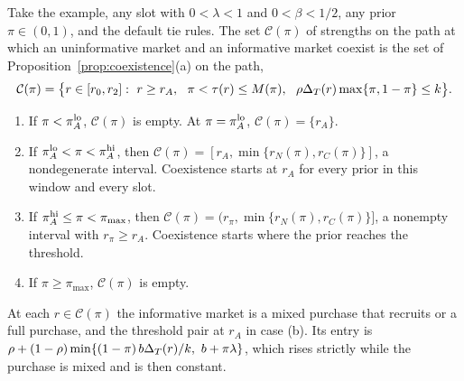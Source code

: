 \begin{corollary}\label{prop:priors}
Take the example, any slot with \(0<\lambda<1\) and \(0<\beta<1/2\), any prior \(\pi\in(0,1)\), and the default tie
rules. The set \(\mathcal C(\pi)\) of strengths on the path at which an uninformative market and an informative market coexist
is the set of Proposition~\ref{prop:coexistence}(a) on the path,
\[
\mathcal C(\pi)=\bigl\{r\in[r_0,r_2]:\ r\ge r_A,\ \ \pi<\tau(r)\le M(\pi),\ \ \rho\Delta_T(r)\max\{\pi,1-\pi\}\le k\bigr\}.
\]
\begin{enumerate}[label=(\alph*),leftmargin=2em]
\item If \(\pi<\pi_A^{\rm lo}\), \(\mathcal C(\pi)\) is empty. At \(\pi=\pi_A^{\rm lo}\), \(\mathcal C(\pi)=\{r_A\}\).
\item If \(\pi_A^{\rm lo}<\pi<\pi_A^{\rm hi}\), then \(\mathcal C(\pi)=[r_A,\min\{r_N(\pi),r_C(\pi)\}]\), a nondegenerate
interval. Coexistence starts at \(r_A\) for every prior in this window and every slot.
\item If \(\pi_A^{\rm hi}\le\pi<\pi_{\max}\), then \(\mathcal C(\pi)=(r_\pi,\min\{r_N(\pi),r_C(\pi)\}]\), a nonempty
interval with \(r_\pi\ge r_A\). Coexistence starts where the prior reaches the threshold.
\item If \(\pi\ge\pi_{\max}\), \(\mathcal C(\pi)\) is empty.
\end{enumerate}
At each \(r\in\mathcal C(\pi)\) the informative market is a mixed purchase that recruits or a full purchase, and the
threshold pair at \(r_A\) in case (b). Its entry is \(\rho+(1-\rho)\min\{(1-\pi)\,b\DT(r)/k,\ b+\pi\lambda\}\), which
rises strictly while the purchase is mixed and is then constant.
\end{corollary}

